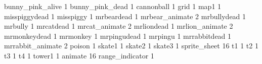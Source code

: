 bunny_pink_alive 1
bunny_pink_dead 1
cannonball 1
grid 1
map1 1
misspiggydead 1
misspiggy 1
mrbeardead 1
mrbear_animate 2
mrbullydead 1
mrbully 1
mrcatdead 1
mrcat_animate 2
mrliondead 1
mrlion_animate 2
mrmonkeydead 1
mrmonkey 1
mrpingudead 1
mrpingu 1
mrrabbitdead 1
mrrabbit_animate 2
poison 1
skate1 1
skate2 1
skate3 1
sprite_sheet 16
t1 1
t2 1
t3 1
t4 1
tower1 1
animate 16
range_indicator 1


